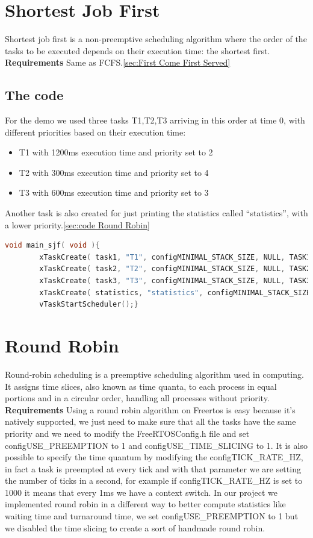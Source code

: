 \documentclass[9pt, reqno]{amsart}
\theoremstyle{definition}
\theoremstyle{remark}
\numberwithin{equation}{section}
\begin{document}
{\section{Shortest Job First}
Shortest job first is a non-preemptive scheduling algorithm where the order of the tasks to be executed depends on their execution time: the shortest first.\newline
\textbf{Requirements}
Same as FCFS.\ref{sec:First Come First Served}
\subsection{The code}
For the demo we used three tasks T1,T2,T3 arriving in this order at time 0, with different priorities based on their execution time: 
\begin{itemize}
    \item T1 with 1200ms execution time and priority set to 2
    \item T2 with 300ms execution time and priority set to 4
    \item T3 with 600ms execution time and priority set to 3
\end{itemize}
Another task is also created for just printing the statistics called “statistics”, with a lower priority.\ref{sec:code Round Robin}
\begin{lstlisting}[breaklines=true, basicstyle=\bfseries,language=c,basicstyle=\small]
void main_sjf( void ){
		xTaskCreate( task1, "T1", configMINIMAL_STACK_SIZE, NULL, TASK1_PRIORITY, NULL );
		xTaskCreate( task2, "T2", configMINIMAL_STACK_SIZE, NULL, TASK2_PRIORITY, NULL );
		xTaskCreate( task3, "T3", configMINIMAL_STACK_SIZE, NULL, TASK3_PRIORITY, NULL );
		xTaskCreate( statistics, "statistics", configMINIMAL_STACK_SIZE, NULL, STAT_PRIORITY, NULL );
		vTaskStartScheduler();}
\end{lstlisting} 

\section{Round Robin}
Round-robin scheduling is a preemptive scheduling algorithm used in computing. It assigns time slices, also known as time quanta, to each process in equal portions and in a circular order, handling all processes without priority.\newline
\textbf{Requirements}\newline
Using a round robin algorithm on Freertos is easy because it’s natively supported, we just need to make sure that all the tasks have the same priority and we need to modify the FreeRTOSConfig.h file and set configUSE\_PREEMPTION to 1 and configUSE\_TIME\_SLICING to 1. It is also possible to specify the time quantum by modifying the configTICK\_RATE\_HZ, in fact a task is preempted at every tick and with that parameter we are setting the number of ticks in a second, for example if configTICK\_RATE\_HZ is set to 1000 it means that every 1ms we have a context switch. 
In our project we implemented round robin in a different way to better compute statistics like waiting time and turnaround time, we set configUSE\_PREEMPTION to 1 but we disabled the time slicing to create a sort of handmade round robin.

}
\end{document}
